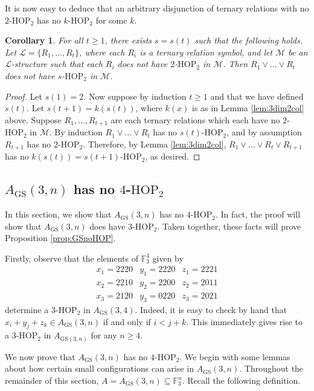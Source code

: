 \documentclass[12pt,oneside,british,a4wide]{amsart}
\newtheorem{corollary}[theorem]{Corollary}
\numberwithin{equation}{section}
\theoremstyle{definition}
\def\F{\mathbb{F}}
\def\HOP{\mathrm{HOP}}
\def\GS{\mathrm{GS}}
\newcommand{\calL}{\mathcal{L}}
\newcommand{\calM}{\mathcal{M}}
\begin{document}
It is now easy to deduce that an arbitrary disjunction of ternary relations with no $2$-$\HOP_2$ has no $k$-$\HOP_2$ for some $k$.

\begin{corollary}
For all $t\geq 1$, there exists $s=s(t)$ such that the following holds. Let $\calL=\{R_1,\ldots, R_t\}$, where each $R_i$ is a ternary relation symbol, and let $\calM$ be an $\calL$-structure such that each $R_i$ does not have $2$-$\HOP_2$ in $\calM$. Then $R_1\vee \ldots \vee R_t$ does not have $s$-$\HOP_2$ in $\calM$.
\end{corollary}
\begin{proof}
Let $s(1)=2$.  Now suppose by induction $t\geq 1$ and that we have defined $s(t)$. Let $s(t+1)=k(s(t))$, where $k(x)$ is as in Lemma \ref{lem:3dim2col} above.  Suppose $R_1,\ldots, R_{t+1}$ are each ternary relations which each have no $2$-$\HOP_2$ in $\calM$.  By induction $R_1\vee \ldots \vee R_t$ has no $s(t)$-$\HOP_2$, and by assumption $R_{t+1}$ has no $2$-$\HOP_2$.  Therefore, by Lemma \ref{lem:3dim2col}, $R_1\vee \ldots \vee R_t \vee R_{t+1}$ has no $k(s(t))=s(t+1)$-$\HOP_2$, as desired.
\end{proof}


\vspace{2mm}

\subsection{$A_{\GS}(3,n)$ has no $4$-$\HOP_2$}\label{app:no4hop} In this section, we show that $A_{\GS}(3,n)$ has no $4$-$\HOP_2$. In fact, the proof will show that $A_{\GS}(3,n)$ does have $3$-$\HOP_2$. Taken together, these facts will prove Proposition \ref{prop:GSnoHOP}.

Firstly, observe that the elements of $\F_3^4$ given by
\[\begin{array}{ccc}
x_1=2220 & y_1=2220 &z_1=2221\\
x_2=2210 & y_2=2200 & z_2=2011\\
x_3=2120 & y_3=0220 & z_3=2021
\end{array}\]
determine a $3$-$\HOP_2$ in $A_{\GS}(3,4)$. Indeed, it is easy to check by hand that $x_i+y_j+z_k\in A_{\GS}(3,n)$ if and only if $i<j+k$. This immediately gives rise to a $3$-$\HOP_2$ in $A_{\GS(3,n)}$ for any $n\geq 4$.

We now prove that $A_{\GS}(3,n)$ has no $4$-$\HOP_2$.  We begin with some lemmas about how certain small configurations can arise in $A_{\GS}(3,n)$. Throughout the remainder of this section, $A=A_{\GS}(3,n)\subseteq \F_3^n$.  Recall the following definition.
\end{document}

